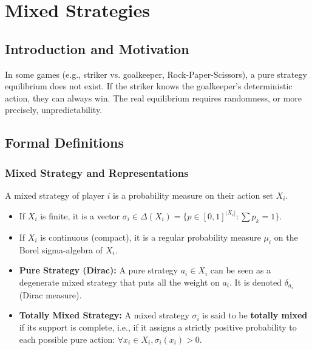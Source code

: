 \chapter{Mixed Strategies}

\section{Introduction and Motivation}
In some games (e.g., striker vs. goalkeeper, Rock-Paper-Scissors), a pure strategy equilibrium does not exist. If the striker knows the goalkeeper's deterministic action, they can always win. The real equilibrium requires randomness, or more precisely, unpredictability.

\section{Formal Definitions}

\subsection{Mixed Strategy and Representations}
\begin{definition}
A mixed strategy of player $i$ is a probability measure on their action set $X_i$.
\begin{itemize}
    \item If $X_i$ is finite, it is a vector $\sigma_i \in \Delta(X_i) = \{ p \in [0,1]^{|X_i|} : \sum p_k = 1 \}$.
    \item If $X_i$ is continuous (compact), it is a regular probability measure $\mu_i$ on the Borel sigma-algebra of $X_i$.
\end{itemize}
\end{definition}

\begin{definition}
\begin{itemize}
    \item \textbf{Pure Strategy (Dirac):} A pure strategy $a_i \in X_i$ can be seen as a degenerate mixed strategy that puts all the weight on $a_i$. It is denoted $\delta_{a_i}$ (Dirac measure).
    \item \textbf{Totally Mixed Strategy:} A mixed strategy $\sigma_i$ is said to be \textbf{totally mixed} if its support is complete, i.e., if it assigns a strictly positive probability to each possible pure action: $\forall x_i \in X_i, \sigma_i(x_i) > 0$.
\end{itemize}
\end{definition}

